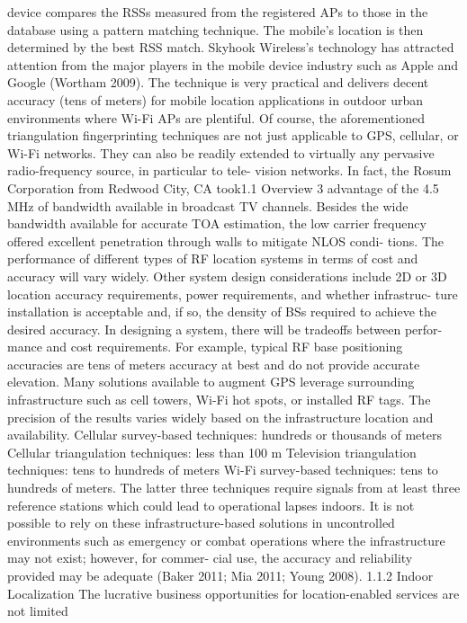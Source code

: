 device compares the RSSs measured from the registered APs to those in the
database using a pattern matching technique. The mobile’s location is then
determined by the best RSS match. Skyhook Wireless’s technology has attracted
attention from the major players in the mobile device industry such as Apple and
Google (Wortham 2009). The technique is very practical and delivers decent
accuracy (tens of meters) for mobile location applications in outdoor urban
environments where Wi-Fi APs are plentiful.
Of course, the aforementioned triangulation fingerprinting techniques are not
just applicable to GPS, cellular, or Wi-Fi networks. They can also be readily
extended to virtually any pervasive radio-frequency source, in particular to tele-
vision networks. In fact, the Rosum Corporation from Redwood City, CA took1.1 Overview
3
advantage of the 4.5 MHz of bandwidth available in broadcast TV channels.
Besides the wide bandwidth available for accurate TOA estimation, the low carrier
frequency offered excellent penetration through walls to mitigate NLOS condi-
tions. The performance of different types of RF location systems in terms of cost
and accuracy will vary widely. Other system design considerations include 2D or
3D location accuracy requirements, power requirements, and whether infrastruc-
ture installation is acceptable and, if so, the density of BSs required to achieve the
desired accuracy. In designing a system, there will be tradeoffs between perfor-
mance and cost requirements. For example, typical RF base positioning accuracies
are tens of meters accuracy at best and do not provide accurate elevation. Many
solutions available to augment GPS leverage surrounding infrastructure such as
cell towers, Wi-Fi hot spots, or installed RF tags. The precision of the results
varies widely based on the infrastructure location and availability.
Cellular survey-based techniques: hundreds or thousands of meters
Cellular triangulation techniques: less than 100 m
Television triangulation techniques: tens to hundreds of meters
Wi-Fi survey-based techniques: tens to hundreds of meters.
The latter three techniques require signals from at least three reference stations
which could lead to operational lapses indoors. It is not possible to rely on these
infrastructure-based solutions in uncontrolled environments such as emergency or
combat operations where the infrastructure may not exist; however, for commer-
cial use, the accuracy and reliability provided may be adequate (Baker 2011; Mia
2011; Young 2008).
1.1.2 Indoor Localization
The lucrative business opportunities for location-enabled services are not limited
